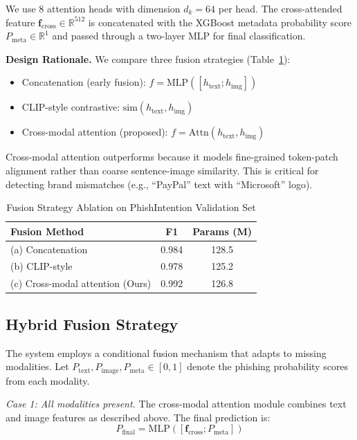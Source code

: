 \documentclass[conference]{IEEEtran}
\begin{document}
We use 8 attention heads with dimension $d_k = 64$ per head. The cross-attended feature $\mathbf{f}_{\text{cross}} \in \mathbb{R}^{512}$ is concatenated with the XGBoost metadata probability score $P_{\text{meta}} \in \mathbb{R}^{1}$ and passed through a two-layer MLP for final classification.

\textbf{Design Rationale.} We compare three fusion strategies (Table~\ref{tab:fusion}):
\begin{itemize}
    \item Concatenation (early fusion): $f = \text{MLP}([h_{\text{text}}; h_{\text{img}}])$
    \item CLIP-style contrastive: $\text{sim}(h_{\text{text}}, h_{\text{img}})$
    \item Cross-modal attention (proposed): $f = \text{Attn}(h_{\text{text}}, h_{\text{img}})$
\end{itemize}

Cross-modal attention outperforms because it models fine-grained token-patch alignment rather than coarse sentence-image similarity. This is critical for detecting brand mismatches (e.g., ``PayPal'' text with ``Microsoft'' logo).

\begin{table}[t]
    \centering
    \caption{Fusion Strategy Ablation on PhishIntention Validation Set}
    \label{tab:fusion}
    \begin{tabular}{lcc}
        \toprule
        Fusion Method & F1 & Params (M) \\
        \midrule
        (a) Concatenation & 0.984 & 128.5 \\
        (b) CLIP-style & 0.978 & 125.2 \\
        (c) Cross-modal attention (Ours) & 0.992 & 126.8 \\
        \bottomrule
    \end{tabular}
\end{table}

\subsection{Hybrid Fusion Strategy}

The system employs a conditional fusion mechanism that adapts to missing modalities. Let $P_{\text{text}}, P_{\text{image}}, P_{\text{meta}} \in [0,1]$ denote the phishing probability scores from each modality.

\textit{Case 1: All modalities present.} The cross-modal attention module combines text and image features as described above. The final prediction is:
\begin{equation}
    P_{\text{final}} = \text{MLP}([\mathbf{f}_{\text{cross}}; P_{\text{meta}}])
\end{equation}
\end{document}
